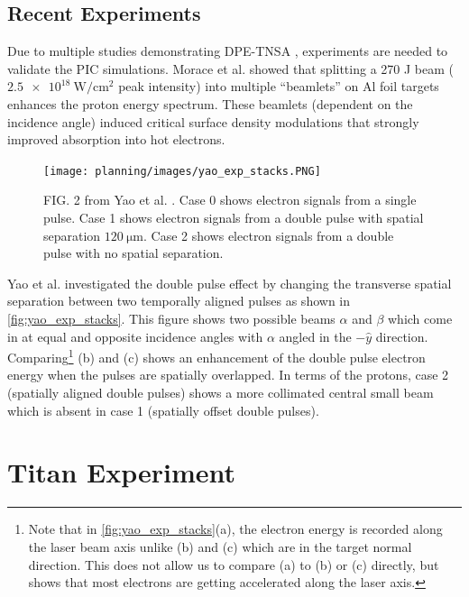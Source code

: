 
\subsection{Recent Experiments}

Due to multiple studies demonstrating \gls{DPE-TNSA} \cite{Ferri_2019_Nat_Comm,Rahman_2021_PoP,Khan_2024_NJoP}, experiments are needed to validate the \gls{PIC} simulations. Morace et al. \cite{Morace_2019_Nat_Comm} showed that splitting a 270 J beam ($\SI{2.5e18}{\watt \per \centi \meter \squared}$ peak intensity) into multiple ``beamlets'' on Al foil targets enhances the proton energy spectrum. These beamlets (dependent on the incidence angle) induced critical surface density modulations that strongly improved absorption into hot electrons. 

\begin{figure}
	\centering 
	\texttt{[image: planning/images/yao\_exp\_stacks.PNG]}
	\caption{FIG. 2 from Yao et al. \cite{Yao_2024_MaRaE}. Case 0 shows electron signals from a single pulse. Case 1 shows electron signals from a double pulse with spatial separation $\SI{120}{\micro \meter}$. Case 2 shows electron signals from a double pulse with no spatial separation.}
	\label{fig:yao_exp_stacks}
\end{figure}

Yao et al. \cite{Yao_2024_MaRaE} investigated the double pulse effect by changing the transverse spatial separation between two temporally aligned pulses as shown in \autoref{fig:yao_exp_stacks}. This figure shows two possible beams $\alpha$ and $\beta$ which come in at equal and opposite incidence angles with $\alpha$ angled in the $-\hat{y}$ direction. Comparing\footnote{Note that in \autoref{fig:yao_exp_stacks}(a), the electron energy is recorded along the laser beam axis unlike (b) and (c) which are in the target normal direction. This does not allow us to compare (a) to (b) or (c) directly, but shows that most electrons are getting accelerated along the laser axis.} (b) and (c) shows an enhancement of the double pulse electron energy when the pulses are spatially overlapped. In terms of the protons, case 2 (spatially aligned double pulses) shows a more collimated central small beam which is absent in case 1 (spatially offset double pulses).

\section{Titan Experiment} \label{sec:titan_experiment}

